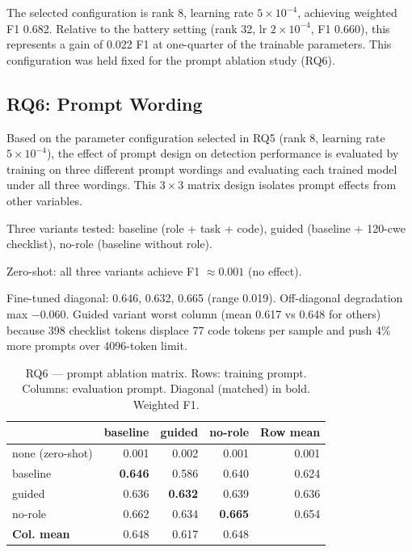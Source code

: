 The selected configuration is rank 8, learning rate $5\times10^{-4}$, achieving weighted F1 0.682. Relative to the battery setting (rank 32, lr $2\times10^{-4}$, F1 0.660), this represents a gain of 0.022 F1 at one-quarter of the trainable parameters. This configuration was held fixed for the prompt ablation study (RQ6).

\subsection{RQ6: Prompt Wording}

Based on the parameter configuration selected in RQ5 (rank 8, learning rate $5\times10^{-4}$), the effect of prompt design on detection performance is evaluated by training on three different prompt wordings and evaluating each trained model under all three wordings. This $3\times3$ matrix design isolates prompt effects from other variables.

Three variants tested: baseline (role + task + code), guided (baseline + 120-\gls{cwe} checklist), no-role (baseline without role).

Zero-shot: all three variants achieve F1 $\approx 0.001$ (no effect).

Fine-tuned diagonal: 0.646, 0.632, 0.665 (range 0.019). Off-diagonal degradation max $-0.060$. Guided variant worst column (mean 0.617 vs 0.648 for others) because 398 checklist tokens displace 77 code tokens per sample and push 4\% more prompts over 4096-token limit.

\begin{table}[H]
\centering
\caption{RQ6 --- prompt ablation matrix. Rows: training prompt. Columns: evaluation prompt. Diagonal (matched) in bold. Weighted F1.}
\label{tab:rq6}
\footnotesize
\begin{tabular}{l r r r r}
\toprule
& \textbf{baseline} & \textbf{guided} & \textbf{no-role} & \textbf{Row mean} \\
\midrule
none (zero-shot) & 0.001 & 0.002 & 0.001 & 0.001 \\
\midrule
baseline & \textbf{0.646} & 0.586 & 0.640 & 0.624 \\
guided   & 0.636 & \textbf{0.632} & 0.639 & 0.636 \\
no-role  & 0.662 & 0.634 & \textbf{0.665} & 0.654 \\
\midrule
\textbf{Col. mean} & 0.648 & 0.617 & 0.648 & \\
\bottomrule
\end{tabular}
\end{table}

